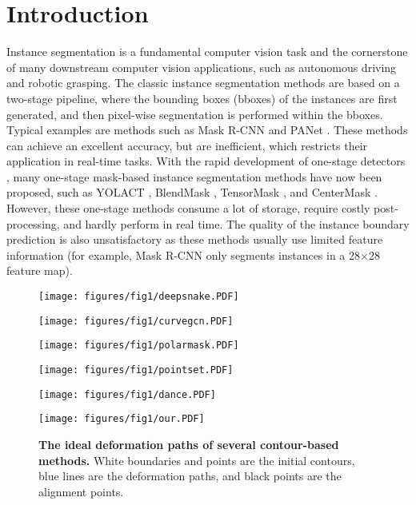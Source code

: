 \documentclass[10pt,twocolumn,letterpaper]{article}
\begin{document}
\section{Introduction}
\label{sec:intro}
Instance segmentation is a fundamental computer vision task and the cornerstone of many downstream computer vision applications, such as autonomous driving and robotic grasping. The classic instance segmentation methods are based on a two-stage pipeline, where the bounding boxes (bboxes) of the instances are first generated, and then pixel-wise segmentation is performed within the bboxes. Typical examples are methods such as Mask R-CNN \cite{maskrcnn} and PANet \cite{panet}. These methods can achieve an excellent accuracy, but are inefficient, which restricts their application in real-time tasks. With the rapid development of one-stage detectors \cite{centernet,fcos}, many one-stage mask-based instance segmentation methods have now been proposed, such as YOLACT \cite{yolact}, BlendMask \cite{blendmask}, TensorMask \cite{tensormask}, and CenterMask \cite{centermask}. However, these one-stage methods consume a lot of storage, require costly post-processing, and hardly perform in real time. The quality of the instance boundary prediction is also unsatisfactory as these methods usually use limited feature information (for example, Mask R-CNN only segments instances in a 28×28 feature map).
\begin{figure}[t]
\begin{minipage}[c]{0.33\linewidth}
\texttt{[image: figures/fig1/deepsnake.PDF]}
\end{minipage}\hfill
\begin{minipage}[c]{0.33\linewidth}
\texttt{[image: figures/fig1/curvegcn.PDF]}
\end{minipage}\hfill
\begin{minipage}[c]{0.33\linewidth}
\texttt{[image: figures/fig1/polarmask.PDF]}
\end{minipage}\hfill
\begin{minipage}[c]{0.33\linewidth}
\texttt{[image: figures/fig1/pointset.PDF]}
\end{minipage}\hfill
\begin{minipage}[c]{0.33\linewidth}
\texttt{[image: figures/fig1/dance.PDF]}
\end{minipage}\hfill
\begin{minipage}[c]{0.33\linewidth}
\texttt{[image: figures/fig1/our.PDF]}
\end{minipage}\hfill
\vspace{-2mm}
\caption{\textbf{The ideal deformation paths of several contour-based methods.} White boundaries and points are the initial contours, blue lines are the deformation paths, and black points are the alignment points.}\vspace{-8mm}
\label{fig:deform path}
\end{figure}
\end{document}

